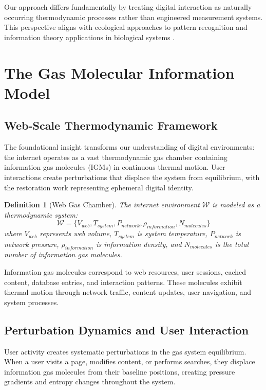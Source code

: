 \documentclass[12pt,a4paper]{article}
\newtheorem{definition}{Definition}
\begin{document}
Our approach differs fundamentally by treating digital interaction as naturally occurring thermodynamic processes rather than engineered measurement systems. This perspective aligns with ecological approaches to pattern recognition \cite{gibson2014ecological} and information theory applications in biological systems \cite{krakauer2020worlds}.

\section{The Gas Molecular Information Model}

\subsection{Web-Scale Thermodynamic Framework}

The foundational insight transforms our understanding of digital environments: the internet operates as a vast thermodynamic gas chamber containing information gas molecules (IGMs) in continuous thermal motion. User interactions create perturbations that displace the system from equilibrium, with the restoration work representing ephemeral digital identity.

\begin{definition}[Web Gas Chamber]
The internet environment $\mathcal{W}$ is modeled as a thermodynamic system:
\begin{equation}
\mathcal{W} = \{V_{web}, T_{system}, P_{network}, \rho_{information}, N_{molecules}\}
\end{equation}
where $V_{web}$ represents web volume, $T_{system}$ is system temperature, $P_{network}$ is network pressure, $\rho_{information}$ is information density, and $N_{molecules}$ is the total number of information gas molecules.
\end{definition}

Information gas molecules correspond to web resources, user sessions, cached content, database entries, and interaction patterns. These molecules exhibit thermal motion through network traffic, content updates, user navigation, and system processes.

\subsection{Perturbation Dynamics and User Interaction}

User activity creates systematic perturbations in the gas system equilibrium. When a user visits a page, modifies content, or performs searches, they displace information gas molecules from their baseline positions, creating pressure gradients and entropy changes throughout the system.
\end{document}
